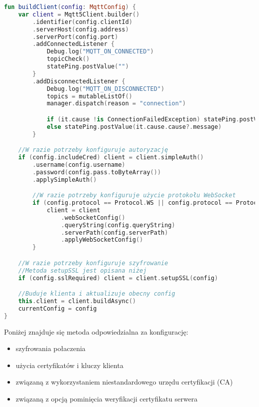 \begin{lstlisting}[language=Kotlin]
fun buildClient(config: MqttConfig) {
    var client = Mqtt5Client.builder()
        .identifier(config.clientId)
        .serverHost(config.address)
        .serverPort(config.port)
        .addConnectedListener {
            Debug.log("MQTT_ON_CONNECTED")
            topicCheck()
            statePing.postValue("")
        }
        .addDisconnectedListener {
            Debug.log("MQTT_ON_DISCONNECTED")
            topics = mutableListOf()
            manager.dispatch(reason = "connection")

            if (it.cause !is ConnectionFailedException) statePing.postValue("")
            else statePing.postValue(it.cause.cause?.message)
        }

    //W razie potrzeby konfiguruje autoryzację
    if (config.includeCred) client = client.simpleAuth()
        .username(config.username)
        .password(config.pass.toByteArray())
        .applySimpleAuth()

        //W razie potrzeby konfiguruje użycie protokołu WebSocket
        if (config.protocol == Protocol.WS || config.protocol == Protocol.WSS) {
            client = client
                .webSocketConfig()
                .queryString(config.queryString)
                .serverPath(config.serverPath)
                .applyWebSocketConfig()
        }

    //W razie potrzeby konfiguruje szyfrowanie
    //Metoda setupSSL jest opisana niżej
    if (config.sslRequired) client = client.setupSSL(config)

    //Buduje klienta i aktualizuje obecny config
    this.client = client.buildAsync()
    currentConfig = config
}
\end{lstlisting}

\newpage

Poniżej znajduje się metoda odpowiedzialna za konfigurację:
\begin{itemize}[leftmargin=*]
    \item szyfrowania połaczenia
    \item użycia certyfikatów i kluczy klienta
    \item związaną z wykorzystaniem niestandardowego urzędu certyfikacji (CA)
    \item związaną z opcją pominięcia weryfikacji certyfikatu serwera
\end{itemize}

